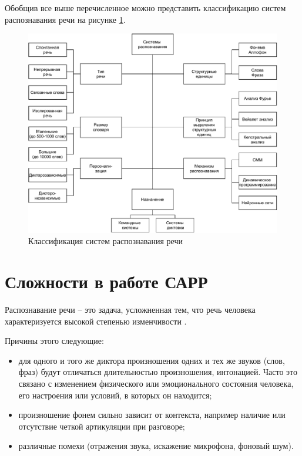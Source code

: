 Обобщив все выше перечисленное можно представить классификацию систем распознавания речи на рисунке \ref{fig:xray3}.

\begin{figure}[h!]
	\includegraphics[pages=-, scale=0.9]{./inc/img/2.pdf}
	\caption{Классификация систем распознавания речи}  
	\label{fig:xray3}
\end{figure}
\newpage

\section{Сложности в работе САРР}
Распознавание речи -- это задача, усложненная тем, что речь человека характеризуется высокой степенью изменчивости \cite{spr}. 

Причины этого следующие:
\begin{itemize}
	\item для одного и того же диктора произношения одних и тех же звуков (слов, фраз) будут отличаться длительностью произношения, интонацией. Часто это связано с изменением физического или эмоционального состояния человека, его настроения или условий, в которых он находится;
	\item произношение фонем сильно зависит от контекста, например наличие или отсутствие четкой артикуляции при разговоре;
	\item различные помехи (отражения звука, искажение микрофона, фоновый шум).
\end{itemize}

